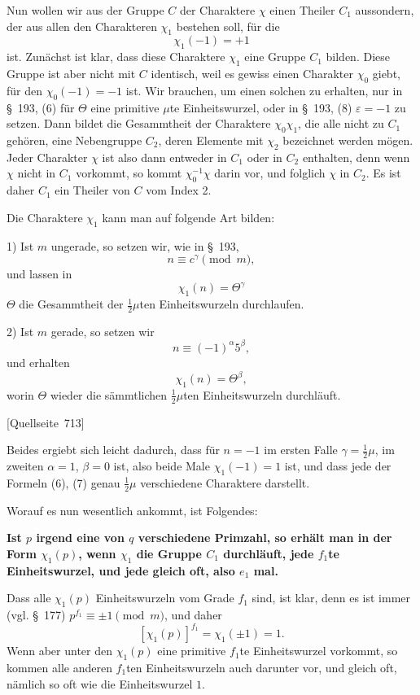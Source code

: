 \documentclass[11pt]{article}
\newcommand{\eps}{\varepsilon}
\newcommand{\srcpage}[1]{\par\medskip\noindent\textsf{[Quellseite~#1]}\par\smallskip}
\begin{document}
Nun wollen wir aus der Gruppe $C$ der Charaktere $\chi$ einen Theiler $C_1$ aussondern, der aus allen den Charakteren $\chi_1$ bestehen soll, für die
\begin{equation}
\chi_1(-1)=+1
\tag{5}
\end{equation}
ist. Zunächst ist klar, dass diese Charaktere $\chi_1$ eine Gruppe $C_1$ bilden. Diese Gruppe ist aber nicht mit $C$ identisch, weil es gewiss einen Charakter $\chi_0$ giebt, für den $\chi_0(-1)=-1$ ist. Wir brauchen, um einen solchen zu erhalten, nur in \S~193, (6) für $\Theta$ eine primitive $\mu$te Einheitswurzel, oder in \S~193, (8) $\eps=-1$ zu setzen. Dann bildet die Gesammtheit der Charaktere $\chi_0\chi_1$, die alle nicht zu $C_1$ gehören, eine Nebengruppe $C_2$, deren Elemente mit $\chi_2$ bezeichnet werden mögen. Jeder Charakter $\chi$ ist also dann entweder in $C_1$ oder in $C_2$ enthalten, denn wenn $\chi$ nicht in $C_1$ vorkommt, so kommt $\chi_0^{-1}\chi$ darin vor, und folglich $\chi$ in $C_2$. Es ist daher $C_1$ ein Theiler von $C$ vom Index 2.

Die Charaktere $\chi_1$ kann man auf folgende Art bilden:

1) Ist $m$ ungerade, so setzen wir, wie in \S~193,
\[
n\equiv c^\gamma\pmod m,
\]
und lassen in
\begin{equation}
\chi_1(n)=\Theta^\gamma
\tag{6}
\end{equation}
$\Theta$ die Gesammtheit der $\frac12\mu$ten Einheitswurzeln durchlaufen.

2) Ist $m$ gerade, so setzen wir
\[
n\equiv(-1)^\alpha5^\beta,
\]
und erhalten
\begin{equation}
\chi_1(n)=\Theta^\beta,
\tag{7}
\end{equation}
worin $\Theta$ wieder die sämmtlichen $\frac12\mu$ten Einheitswurzeln durchläuft.

\srcpage{713}
Beides ergiebt sich leicht dadurch, dass für $n=-1$ im ersten Falle $\gamma=\frac12\mu$, im zweiten $\alpha=1$, $\beta=0$ ist, also beide Male $\chi_1(-1)=1$ ist, und dass jede der Formeln (6), (7) genau $\frac12\mu$ verschiedene Charaktere darstellt.

Worauf es nun wesentlich ankommt, ist Folgendes:
\begin{center}
\textbf{Ist $p$ irgend eine von $q$ verschiedene Primzahl, so erhält man in der Form $\chi_1(p)$, wenn $\chi_1$ die Gruppe $C_1$ durchläuft, jede $f_1$te Einheitswurzel, und jede gleich oft, also $e_1$ mal.}
\end{center}
Dass alle $\chi_1(p)$ Einheitswurzeln vom Grade $f_1$ sind, ist klar, denn es ist immer (vgl. \S~177) $p^{f_1}\equiv\pm1\pmod m$, und daher
\[
[\chi_1(p)]^{f_1}=\chi_1(\pm1)=1.
\]
Wenn aber unter den $\chi_1(p)$ eine primitive $f_1$te Einheitswurzel vorkommt, so kommen alle anderen $f_1$ten Einheitswurzeln auch darunter vor, und gleich oft, nämlich so oft wie die Einheitswurzel $1$.
\end{document}
